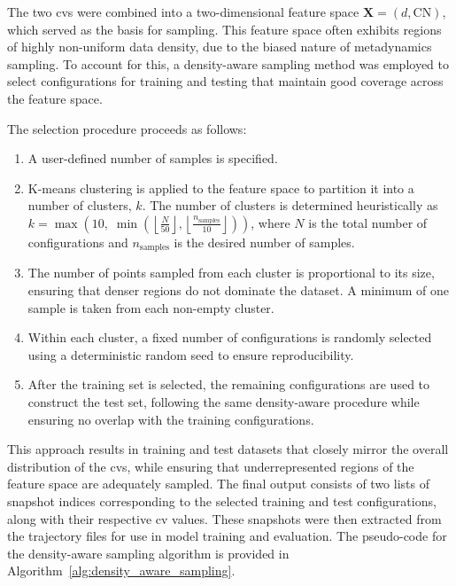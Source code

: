 The two \acp{cv} were combined into a two-dimensional feature space $\mathbf{X} = (d, \mathrm{CN})$, which served as the basis for sampling. This feature space often exhibits regions of highly non-uniform data density, due to the biased nature of metadynamics sampling. To account for this, a density-aware sampling method was employed to select configurations for training and testing that maintain good coverage across the feature space.

The selection procedure proceeds as follows:
\begin{enumerate}
    \item A user-defined number of samples is specified.
    \item K-means clustering is applied to the feature space to partition it into a number of clusters, $k$. The number of clusters is determined heuristically as $k = \max\left(10, \; \min\left(\left\lfloor \frac{N}{50} \right\rfloor, \left\lfloor \frac{n_\text{samples}}{10} \right\rfloor \right)\right)$, where $N$ is the total number of configurations and $n_\text{samples}$ is the desired number of samples.
    \item The number of points sampled from each cluster is proportional to its size, ensuring that denser regions do not dominate the dataset. A minimum of one sample is taken from each non-empty cluster.
    \item Within each cluster, a fixed number of configurations is randomly selected using a deterministic random seed to ensure reproducibility.
    \item After the training set is selected, the remaining configurations are used to construct the test set, following the same density-aware procedure while ensuring no overlap with the training configurations.
\end{enumerate}

This approach results in training and test datasets that closely mirror the overall distribution of the \acp{cv}, while ensuring that underrepresented regions of the feature space are adequately sampled. The final output consists of two lists of snapshot indices corresponding to the selected training and test configurations, along with their respective \ac{cv} values. These snapshots were then extracted from the trajectory files for use in model training and evaluation. The pseudo-code for the density-aware sampling algorithm is provided in Algorithm~\ref{alg:density_aware_sampling}.



